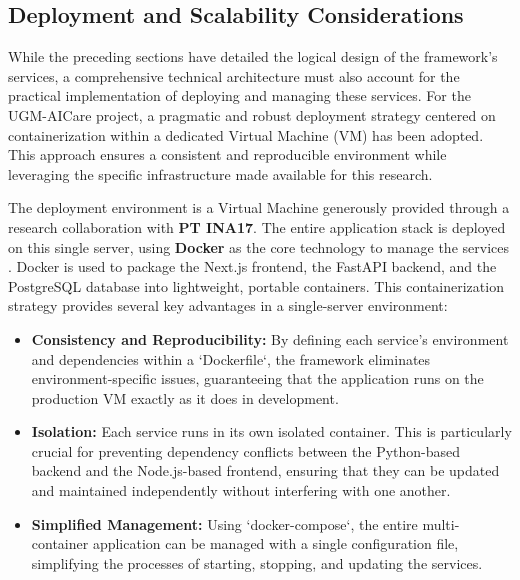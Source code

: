 \subsection{Deployment and Scalability Considerations}

While the preceding sections have detailed the logical design of the framework's services, a comprehensive technical architecture must also account for the practical implementation of deploying and managing these services. For the UGM-AICare project, a pragmatic and robust deployment strategy centered on containerization within a dedicated Virtual Machine (VM) has been adopted. This approach ensures a consistent and reproducible environment while leveraging the specific infrastructure made available for this research.

The deployment environment is a Virtual Machine generously provided through a research collaboration with \textbf{PT INA17}. The entire application stack is deployed on this single server, using \textbf{Docker} as the core technology to manage the services \cite{boettiger2015introductiondocker, merkel2014docker}. Docker is used to package the Next.js frontend, the FastAPI backend, and the PostgreSQL database into lightweight, portable containers. This containerization strategy provides several key advantages in a single-server environment:
\begin{itemize}
    \item \textbf{Consistency and Reproducibility:} By defining each service's environment and dependencies within a `Dockerfile`, the framework eliminates environment-specific issues, guaranteeing that the application runs on the production VM exactly as it does in development.
    \item \textbf{Isolation:} Each service runs in its own isolated container. This is particularly crucial for preventing dependency conflicts between the Python-based backend and the Node.js-based frontend, ensuring that they can be updated and maintained independently without interfering with one another.
    \item \textbf{Simplified Management:} Using `docker-compose`, the entire multi-container application can be managed with a single configuration file, simplifying the processes of starting, stopping, and updating the services.
\end{itemize}


